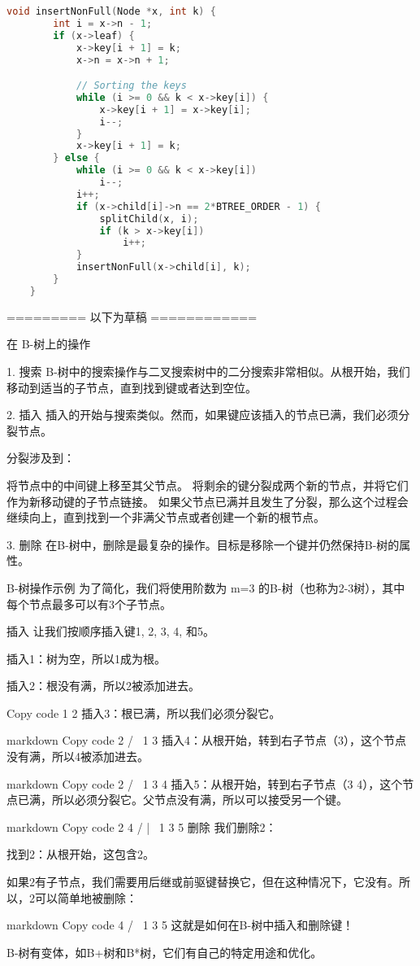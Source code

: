 \begin{lstlisting}[language=cpp,caption=Btree.h]
    void insertNonFull(Node *x, int k) {
        int i = x->n - 1;
        if (x->leaf) {
            x->key[i + 1] = k;
            x->n = x->n + 1;

            // Sorting the keys
            while (i >= 0 && k < x->key[i]) {
                x->key[i + 1] = x->key[i];
                i--;
            }
            x->key[i + 1] = k;
        } else {
            while (i >= 0 && k < x->key[i])
                i--;
            i++;
            if (x->child[i]->n == 2*BTREE_ORDER - 1) {
                splitChild(x, i);
                if (k > x->key[i])
                    i++;
            }
            insertNonFull(x->child[i], k);
        }
    }

\end{lstlisting}


========= 以下为草稿 ============


在 B-树上的操作

1. 搜索
B-树中的搜索操作与二叉搜索树中的二分搜索非常相似。从根开始，我们移动到适当的子节点，直到找到键或者达到空位。

2. 插入
插入的开始与搜索类似。然而，如果键应该插入的节点已满，我们必须分裂节点。

分裂涉及到：

将节点中的中间键上移至其父节点。
将剩余的键分裂成两个新的节点，并将它们作为新移动键的子节点链接。
如果父节点已满并且发生了分裂，那么这个过程会继续向上，直到找到一个非满父节点或者创建一个新的根节点。

3. 删除
在B-树中，删除是最复杂的操作。目标是移除一个键并仍然保持B-树的属性。

B-树操作示例
为了简化，我们将使用阶数为 m=3 的B-树（也称为2-3树），其中每个节点最多可以有3个子节点。

插入
让我们按顺序插入键1, 2, 3, 4, 和5。

插入1：树为空，所以1成为根。

插入2：根没有满，所以2被添加进去。

Copy code
 1 2
插入3：根已满，所以我们必须分裂它。

markdown
Copy code
     2
   /   \
 1       3
插入4：从根开始，转到右子节点（3），这个节点没有满，所以4被添加进去。

markdown
Copy code
     2
   /   \
 1      3 4
插入5：从根开始，转到右子节点（3 4），这个节点已满，所以必须分裂它。父节点没有满，所以可以接受另一个键。

markdown
Copy code
     2 4
   /   |   \
 1      3    5
删除
我们删除2：

找到2：从根开始，这包含2。

如果2有子节点，我们需要用后继或前驱键替换它，但在这种情况下，它没有。所以，2可以简单地被删除：

markdown
Copy code
     4
   /   \
 1      3 5
这就是如何在B-树中插入和删除键！


B-树有变体，如B+树和B*树，它们有自己的特定用途和优化。